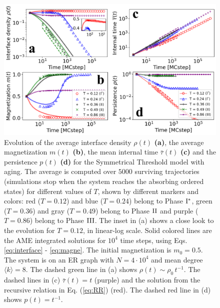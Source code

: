 \begin{figure}[ht]
        \centering \captionsetup{font=sf}
        \includegraphics[width=\textwidth]{Figs/Aging_STM/FIG6_THESIS.pdf}
        \caption[Symmetrical threshold model with aging dynamics in random networks]{\label{fig:evolution_random_aging} Evolution of the average interface density $\rho(t)$ \textbf{(a)}, the average magnetization $m(t)$ \textbf{(b)}, the mean internal time $\bar{\tau}(t)$ \textbf{(c)} and the persistence $p(t)$ \textbf{(d)} for the Symmetrical Threshold model with aging. The average is computed over $5000$ surviving trajectories (simulations stop when the system reaches the absorbing ordered states) for different values of $T$, shown by different markers and colors: red ($T = 0.12$) and blue ($T = 0.24$) belong to Phase ${\rm I}^{*}$, green ($T = 0.36$) and gray ($T = 0.49$) belong to Phase ${\rm II}$ and purple ($T = 0.86$) belong to Phase ${\rm III}$. The inset in (a) shows a close look to the evolution for $T = 0.12$, in linear-log scale. Solid colored lines are the AME integrated solutions for $10^4$ time steps, using Eqs. \ref{eq:interface} - \ref{eq:magne}. The initial magnetization is $m_0 = 0.5$. The system is on an ER graph with $N = 4 \cdot 10^4$ and mean degree $\langle k \rangle = 8$. The dashed green line in (a) shows $\rho(t) \sim \rho_0 \, t^{-1}$. The dashed lines in (c) $\bar{\tau}(t) = t$ (purple) and the solution from the recursive relation in Eq. (\ref{eq:RR}) (red). The dashed red line in (d) shows $p(t) = t^{-1}$.
        }
\end{figure}

